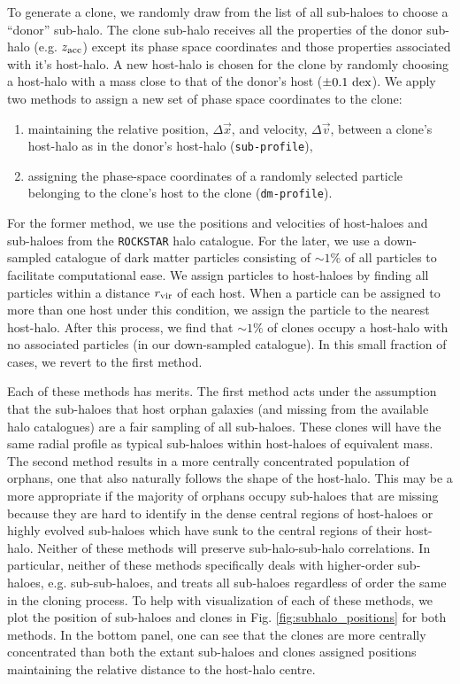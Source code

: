\documentclass[useAMS,fleqn,usenatbib]{mnras}
\begin{document}
To generate a clone, we randomly draw from the list of all sub-haloes to choose a ``donor'' sub-halo.  The clone sub-halo receives all the properties of the donor sub-halo (e.g. $z_{\rm acc}$) except its phase space coordinates and those properties associated with it's host-halo.  A new host-halo is chosen for the clone by randomly choosing a host-halo with a mass close to that of the donor's host ($\pm 0.1~ {\rm dex}$).  We apply two methods to assign a new set of phase space coordinates to the clone:
\begin{enumerate}
\item maintaining the relative position, $\Delta \vec{x}$, and velocity, $\Delta \vec{v}$, between a clone's host-halo as in the donor's host-halo ({\tt sub-profile}),
\item assigning the phase-space coordinates of a randomly selected particle belonging to the clone's host to the clone ({\tt dm-profile}).
\end{enumerate}
For the former method, we use the positions and velocities of host-haloes and sub-haloes from the {\tt ROCKSTAR} halo catalogue.  For the later, we use a down-sampled catalogue of dark matter particles consisting of $\sim 1\%$ of all particles to facilitate computational ease.  We assign particles to host-haloes by finding all particles within a distance $r_{\rm vir}$ of each host.  When a particle can be assigned to more than one host under this condition, we assign the particle to the nearest host-halo.  After this process, we find that $\sim 1\%$ of clones occupy a host-halo with no associated particles (in our down-sampled catalogue).  In this small fraction of cases, we revert to the first method.   

Each of these methods has merits.  The first method acts under the assumption that the sub-haloes that host orphan galaxies (and missing from the available halo catalogues) are a fair sampling of all sub-haloes.  These clones will have the same radial profile as typical sub-haloes within host-haloes of equivalent mass.  The second method results in a more centrally concentrated population of orphans, one that also naturally follows the shape of the host-halo.  This may be a more appropriate if the majority of orphans occupy sub-haloes that are missing because they are hard to identify in the dense central regions of host-haloes or highly evolved sub-haloes which have sunk to the central regions of their host-halo.  Neither of these methods will preserve sub-halo-sub-halo correlations.  In particular, neither of these methods specifically deals with higher-order sub-haloes, e.g. sub-sub-haloes, and treats all sub-haloes regardless of order the same in the cloning process.  To help with visualization of each of these methods, we plot the position of sub-haloes and clones in Fig. \ref{fig:subhalo_positions} for both methods.  In the bottom panel, one can see that the clones are more centrally concentrated than both the extant sub-haloes and clones assigned positions maintaining the relative distance to the host-halo centre. 
  
\end{document}
